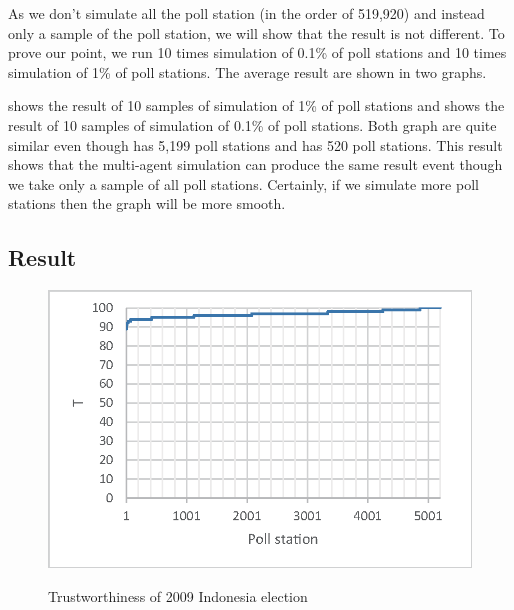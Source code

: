 \documentclass[JIP]{ipsj}
\begin{document}
As we don't simulate all the poll station (in the order of 519,920) and instead only a sample of the poll station, we will show that the result is not different. To prove our point, we run 10 times simulation of 0.1\% of poll stations and 10 times simulation of 1\% of poll stations. The average result are shown in two graphs.

 shows the result of 10 samples of simulation of 1\% of poll stations and  shows the result of 10 samples of simulation of 0.1\% of poll stations. Both graph are quite similar even though  has 5,199 poll stations and  has 520 poll stations. This result shows that the multi-agent simulation can produce the same result event though we take only a sample of all poll stations. Certainly, if we simulate more poll stations then the graph will be more smooth.


\subsection{Result}%

\begin{figure}[tb]%
\vbox{\it
  \hbox{\includegraphics[scale=0.8]{images/Trustworthiness3.eps}}}
\centerline{}
\caption{Trustworthiness of 2009 Indonesia election}
\label{fig:result1}
\end{figure}
\end{document}
